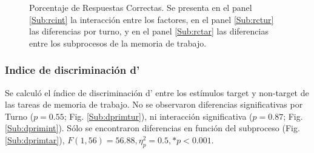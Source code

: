 \documentclass[12pt,letterpaper,final]{article}
\begin{document}
\begin{figure}[h]
	\caption{Porcentaje de Respuestas Correctas. Se presenta en el panel \ref{Sub:rcint} la interacción entre los factores, en el panel \ref{Sub:rctur} las diferencias por turno, y en el panel \ref{Sub:rctar} las diferencias entre los subprocesos de la memoria de trabajo.}
	\label{fig:rc}
\end{figure}

\subsubsection{Indice de discriminación d’}
Se calculó el índice de discriminación d’ entre los estímulos target y non-target de las tareas de memoria de trabajo.  No se observaron diferencias significativas por Turno ($p= 0.55$; Fig. \ref{Sub:dprimtur}), ni interacción significativa ($p= 0.87$; Fig. \ref{Sub:dprimint}). Sólo se encontraron diferencias en función del subproceso (Fig. \ref{Sub:dprimtar}),  $ F (1,56)= 56.88, \eta_{p}^{2}= 0.5,  *p<0.001.$
\end{document}
